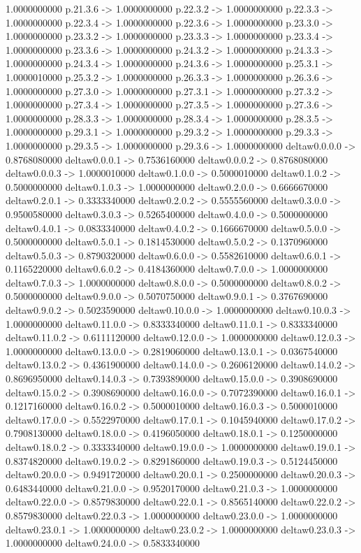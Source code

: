 1.0000000000    p.21.3.6 -> 1.0000000000    p.22.3.2 -> 1.0000000000    p.22.3.3 -> 1.0000000000    p.22.3.4 -> 1.0000000000    p.22.3.6 -> 1.0000000000    p.23.3.0 -> 1.0000000000    p.23.3.2 -> 1.0000000000    p.23.3.3 -> 1.0000000000    p.23.3.4 -> 1.0000000000    p.23.3.6 -> 1.0000000000    p.24.3.2 -> 1.0000000000    p.24.3.3 -> 1.0000000000    p.24.3.4 -> 1.0000000000    p.24.3.6 -> 1.0000000000    p.25.3.1 -> 1.0000010000    p.25.3.2 -> 1.0000000000    p.26.3.3 -> 1.0000000000    p.26.3.6 -> 1.0000000000    p.27.3.0 -> 1.0000000000    p.27.3.1 -> 1.0000000000    p.27.3.2 -> 1.0000000000    p.27.3.4 -> 1.0000000000    p.27.3.5 -> 1.0000000000    p.27.3.6 -> 1.0000000000    p.28.3.3 -> 1.0000000000    p.28.3.4 -> 1.0000000000    p.28.3.5 -> 1.0000000000    p.29.3.1 -> 1.0000000000    p.29.3.2 -> 1.0000000000    p.29.3.3 -> 1.0000000000    p.29.3.5 -> 1.0000000000    p.29.3.6 -> 1.0000000000    deltaw0.0.0.0 -> 0.8768080000    deltaw0.0.0.1 -> 0.7536160000    deltaw0.0.0.2 -> 0.8768080000    deltaw0.0.0.3 -> 1.0000010000    deltaw0.1.0.0 -> 0.5000010000    deltaw0.1.0.2 -> 0.5000000000    deltaw0.1.0.3 -> 1.0000000000    deltaw0.2.0.0 -> 0.6666670000    deltaw0.2.0.1 -> 0.3333340000    deltaw0.2.0.2 -> 0.5555560000    deltaw0.3.0.0 -> 0.9500580000    deltaw0.3.0.3 -> 0.5265400000    deltaw0.4.0.0 -> 0.5000000000    deltaw0.4.0.1 -> 0.0833340000    deltaw0.4.0.2 -> 0.1666670000    deltaw0.5.0.0 -> 0.5000000000    deltaw0.5.0.1 -> 0.1814530000    deltaw0.5.0.2 -> 0.1370960000    deltaw0.5.0.3 -> 0.8790320000    deltaw0.6.0.0 -> 0.5582610000    deltaw0.6.0.1 -> 0.1165220000    deltaw0.6.0.2 -> 0.4184360000    deltaw0.7.0.0 -> 1.0000000000    deltaw0.7.0.3 -> 1.0000000000    deltaw0.8.0.0 -> 0.5000000000    deltaw0.8.0.2 -> 0.5000000000    deltaw0.9.0.0 -> 0.5070750000    deltaw0.9.0.1 -> 0.3767690000    deltaw0.9.0.2 -> 0.5023590000    deltaw0.10.0.0 -> 1.0000000000    deltaw0.10.0.3 -> 1.0000000000    deltaw0.11.0.0 -> 0.8333340000    deltaw0.11.0.1 -> 0.8333340000    deltaw0.11.0.2 -> 0.6111120000    deltaw0.12.0.0 -> 1.0000000000    deltaw0.12.0.3 -> 1.0000000000    deltaw0.13.0.0 -> 0.2819060000    deltaw0.13.0.1 -> 0.0367540000    deltaw0.13.0.2 -> 0.4361900000    deltaw0.14.0.0 -> 0.2606120000    deltaw0.14.0.2 -> 0.8696950000    deltaw0.14.0.3 -> 0.7393890000    deltaw0.15.0.0 -> 0.3908690000    deltaw0.15.0.2 -> 0.3908690000    deltaw0.16.0.0 -> 0.7072390000    deltaw0.16.0.1 -> 0.1217160000    deltaw0.16.0.2 -> 0.5000010000    deltaw0.16.0.3 -> 0.5000010000    deltaw0.17.0.0 -> 0.5522970000    deltaw0.17.0.1 -> 0.1045940000    deltaw0.17.0.2 -> 0.7908130000    deltaw0.18.0.0 -> 0.4196050000    deltaw0.18.0.1 -> 0.1250000000    deltaw0.18.0.2 -> 0.3333340000    deltaw0.19.0.0 -> 1.0000000000    deltaw0.19.0.1 -> 0.8374820000    deltaw0.19.0.2 -> 0.8291860000    deltaw0.19.0.3 -> 0.5124450000    deltaw0.20.0.0 -> 0.9491720000    deltaw0.20.0.1 -> 0.2500000000    deltaw0.20.0.3 -> 0.6483440000    deltaw0.21.0.0 -> 0.9520170000    deltaw0.21.0.3 -> 1.0000000000    deltaw0.22.0.0 -> 0.8579830000    deltaw0.22.0.1 -> 0.8565140000    deltaw0.22.0.2 -> 0.8579830000    deltaw0.22.0.3 -> 1.0000000000    deltaw0.23.0.0 -> 1.0000000000    deltaw0.23.0.1 -> 1.0000000000    deltaw0.23.0.2 -> 1.0000000000    deltaw0.23.0.3 -> 1.0000000000    deltaw0.24.0.0 -> 0.5833340000    